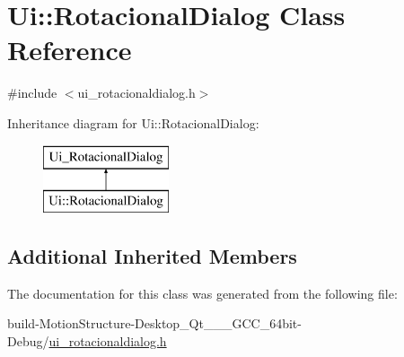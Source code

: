 \hypertarget{class_ui_1_1_rotacional_dialog}{\section{Ui\-:\-:Rotacional\-Dialog Class Reference}
\label{class_ui_1_1_rotacional_dialog}
}


{\ttfamily \#include $<$ui\-\_\-rotacionaldialog.\-h$>$}

Inheritance diagram for Ui\-:\-:Rotacional\-Dialog\-:\begin{figure}[H]
\begin{center}
\leavevmode
\includegraphics[height=2.000000cm]{class_ui_1_1_rotacional_dialog}
\end{center}
\end{figure}
\subsection*{Additional Inherited Members}


The documentation for this class was generated from the following file\-:\begin{DoxyCompactItemize}
\item 
build-\/\-Motion\-Structure-\/\-Desktop\-\_\-\-Qt\-\_\-\_\-\_\-\-G\-C\-C\-\_\-64bit-\/\-Debug/\hyperlink{ui__rotacionaldialog_8h}{ui\-\_\-rotacionaldialog.\-h}\end{DoxyCompactItemize}

